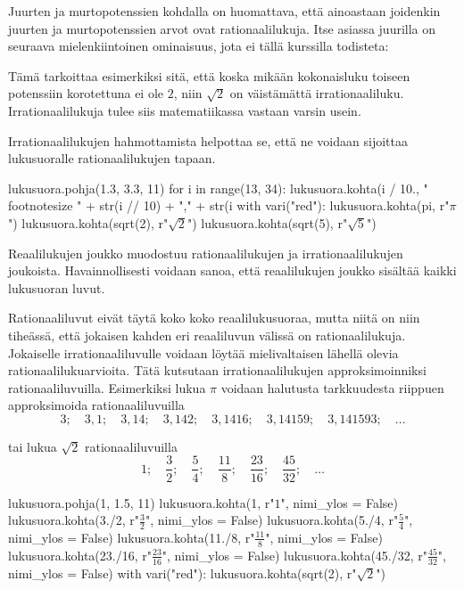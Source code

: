\label{reaaliluvut}

Juurten ja murtopotenssien kohdalla on huomattava, että ainoastaan joidenkin juurten ja murtopotenssien arvot ovat rationaalilukuja. Itse asiassa juurilla on seuraava mielenkiintoinen ominaisuus, jota ei tällä kurssilla todisteta:


Tämä tarkoittaa esimerkiksi sitä, että koska mikään kokonaisluku toiseen potenssiin korotettuna ei ole $2$, niin $\sqrt{2}$ on väistämättä irrationaaliluku. Irrationaalilukuja tulee siis matematiikassa vastaan varsin usein.

Irrationaalilukujen hahmottamista helpottaa se, että ne voidaan sijoittaa lukusuoralle rationaalilukujen tapaan.

\begin{kuva}
lukusuora.pohja(1.3, 3.3, 11)
for i in range(13, 34):
	lukusuora.kohta(i / 10., "\\footnotesize " + str(i // 10) + "," + str(i %
with vari("red"):
	lukusuora.kohta(pi, r"$\pi$")
	lukusuora.kohta(sqrt(2), r"$\sqrt{2}$")
	lukusuora.kohta(sqrt(5), r"$\sqrt{5}$")
\end{kuva}

Reaalilukujen joukko muodostuu rationaalilukujen ja irrationaalilukujen joukoista. Havainnollisesti voidaan sanoa, että reaalilukujen joukko sisältää kaikki lukusuoran luvut.

Rationaaliluvut eivät täytä koko koko reaalilukusuoraa, mutta niitä on niin tiheässä, että jokaisen kahden eri reaaliluvun välissä on rationaalilukuja. Jokaiselle irrationaaliluvulle voidaan löytää mielivaltaisen lähellä olevia rationaalilukuarvioita. Tätä kutsutaan irrationaalilukujen approksimoinniksi rationaaliluvuilla. Esimerkiksi lukua $\pi$ voidaan halutusta tarkkuudesta riippuen approksimoida rationaaliluvuilla
\[
3; \quad 3,1; \quad 3,14; \quad 3,142; \quad 3,1416; \quad 3,14159; \quad 3,141593; \quad \ldots 
\]

tai lukua $\sqrt{2}$ rationaaliluvuilla
\[
1; \quad \frac{3}{2}; \quad \frac{5}{4}; \quad \frac{11}{8}; \quad \frac{23}{16}; \quad \frac{45}{32}; \quad \ldots 
\]

\begin{kuva}
lukusuora.pohja(1, 1.5, 11)
lukusuora.kohta(1, r"\footnotesize $1$", nimi_ylos = False)
lukusuora.kohta(3./2, r"\footnotesize $\frac{3}{2}$", nimi_ylos = False)
lukusuora.kohta(5./4, r"\footnotesize $\frac{5}{4}$", nimi_ylos = False)
lukusuora.kohta(11./8, r"\footnotesize $\frac{11}{8}$", nimi_ylos = False)
lukusuora.kohta(23./16, r"\footnotesize $\frac{23}{16}$", nimi_ylos = False)
lukusuora.kohta(45./32, r"\footnotesize $\frac{45}{32}$", nimi_ylos = False)
with vari("red"):
	lukusuora.kohta(sqrt(2), r"$\sqrt{2}$")
\end{kuva}

